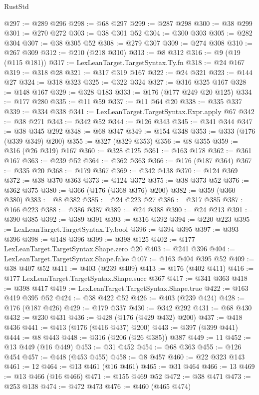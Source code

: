 \begin{lexlean}{RustStd}
\begin{coremodule}
@297 := @289 @296
@298 := @68 @297
@299 := @287 @298
@300 := @38 @299
@301 := @270 @272
@303 := @38 @301 @52
@304 := @300 @303
@305 := @282 @304
@307 := @38 @305 @52
@308 := @279 @307
@309 := @274 @308
@310 := @267 @309
@312 := @210 (@218 @310)
@313 := @8 @312
@316 := @9 (@19 (@115 @181))
@317 := LexLeanTarget.TargetSyntax.Ty.fn
@318 := @24 @167
@319 := @318 @28
@321 := @317 @319 @167
@322 := @24 @321
@323 := @144 @27
@324 := @318 @323
@325 := @322 @324
@327 := @316 @325 @167
@328 := @148 @167
@329 := @328 @183
@333 := @176 (@177 @249 @20 @125)
@334 := @177 @280
@335 := @11 @59
@337 := @11 @64 @20
@338 := @335 @337
@339 := @334 @338
@341 := LexLeanTarget.TargetSyntax.Expr.apply @67
@342 := @38 @271
@343 := @342 @52
@344 := @126 @343
@345 := @341 @344
@347 := @38 @345 @292
@348 := @68 @347
@349 := @154 @348
@353 := @333 (@176 (@339 @349) @200)
@355 := @327 (@329 @353)
@356 := @8 @355
@359 := @316 (@26 @319) @167
@360 := @328 @125
@361 := @163 @178
@362 := @361 @167
@363 := @239 @52
@364 := @362 @363
@366 := @176 (@187 @364)
@367 := @335 @20
@368 := @179 @367
@369 := @342 @138
@370 := @124 @369
@372 := @38 @370 @363
@373 := @124 @372
@375 := @38 @373 @52
@376 := @362 @375
@380 := @366 (@176 (@368 @376) @200)
@382 := @359 (@360 @380)
@383 := @8 @382
@385 := @24 @223 @27
@386 := @317 @385
@387 := @166 @223
@388 := @386 @387
@389 := @24 @388
@390 := @24 @213
@391 := @390 @385
@392 := @389 @391
@393 := @316 @392
@394 := @220 @223
@395 := LexLeanTarget.TargetSyntax.Ty.bool
@396 := @394 @395
@397 := @393 @396
@398 := @148 @396
@399 := @398 @125
@402 := @177 LexLeanTarget.TargetSyntax.Shape.zero @20
@403 := @241 @396
@404 := LexLeanTarget.TargetSyntax.Shape.false
@407 := @163 @404 @395 @52
@409 := @38 @407 @52
@411 := @403 (@239 @409)
@413 := @176 (@402 @411)
@416 := @177 LexLeanTarget.TargetSyntax.Shape.succ @367
@417 := @341 @363
@418 := @398 @417
@419 := LexLeanTarget.TargetSyntax.Shape.true
@422 := @163 @419 @395 @52
@424 := @38 @422 @52
@426 := @403 (@239 @424)
@428 := @176 (@187 @426)
@429 := @179 @337
@430 := @342 @292
@431 := @68 @430
@432 := @230 @431
@436 := @428 (@176 (@429 @432) @200)
@437 := @418 @436
@441 := @413 (@176 (@416 @437) @200)
@443 := @397 (@399 @441)
@444 := @8 @443
@448 := @316 (@206 (@26 @385)) @387
@449 := 11
@452 := @13 @449 (@16 @449)
@453 := @31 @452
@454 := @68 @363
@455 := @126 @454
@457 := @448 (@453 @455)
@458 := @8 @457
@460 := @22 @323 @143
@461 := 12
@464 := @13 @461 (@16 @461)
@465 := @31 @464
@466 := 13
@469 := @13 @466 (@16 @466)
@471 := @155 @469 @52
@472 := @38 @471
@473 := @253 @138
@474 := @472 @473
@476 := @460 (@465 @474)

\end{coremodule}
\end{lexlean}
